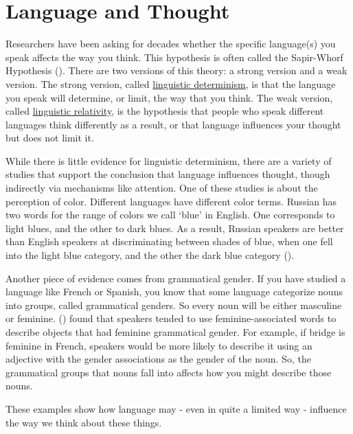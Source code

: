 \documentclass[
]{krantz}
\begin{document}
\section{Language and Thought}\label{language-and-thought}

Researchers have been asking for decades whether the specific language(s) you speak affects the way you think. This hypothesis is often called the Sapir-Whorf Hypothesis (). There are two versions of this theory: a strong version and a weak version. The strong version, called \hyperref[linguistic-determinism]{linguistic determinism}, is that the language you speak will determine, or limit, the way that you think. The weak version, called \hyperref[linguistic-relativity]{linguistic relativity}, is the hypothesis that people who speak different languages think differently as a result, or that language influences your thought but does not limit it.

While there is little evidence for linguistic determinism, there are a variety of studies that support the conclusion that language influences thought, though indirectly via mechanisms like attention. One of these studies is about the perception of color. Different languages have different color terms. Russian has two words for the range of colors we call `blue' in English. One corresponds to light blues, and the other to dark blues. As a result, Russian speakers are better than English speakers at discriminating between shades of blue, when one fell into the light blue category, and the other the dark blue category ().

Another piece of evidence comes from grammatical gender. If you have studied a language like French or Spanish, you know that some language categorize nouns into groups, called grammatical genders. So every noun will be either masculine or feminine. () found that speakers tended to use feminine-associated words to describe objects that had feminine grammatical gender. For example, if bridge is feminine in French, speakers would be more likely to describe it using an adjective with the gender associations as the gender of the noun. So, the grammatical groups that nouns fall into affects how you might describe those nouns.

These examples show how language may - even in quite a limited way - influence the way we think about these things.
\end{document}
